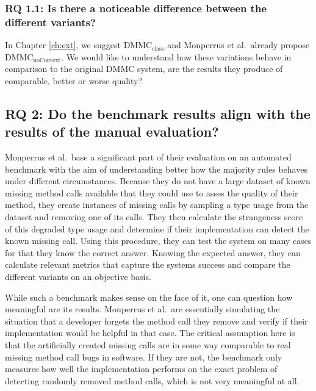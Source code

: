 \subsubsection{RQ 1.1: Is there a noticeable difference between the different variants?}

In Chapter \ref{ch:ext}, we suggest $\text{DMMC}_\text{class}$ and Monperrus et al.\ already propose $\text{DMMC}_\text{noContext}$.
We would like to understand how these variations behave in comparison to the original $\text{DMMC}$ system, are the results they produce of comparable, better or worse quality?

\subsection*{RQ 2: Do the benchmark results align with the results of the manual evaluation?}

Monperrus et al.\ base a significant part of their evaluation on an automated benchmark with the aim of understanding better how the majority rules behaves under different circumstances.
Because they do not have a large dataset of known missing method calls available that they could use to asses the quality of their method, they create instances of missing calls by sampling a type usage from the dataset and removing one of its calls.
They then calculate the strangeness score of this degraded type usage and determine if their implementation can detect the known missing call.
Using this procedure, they can test the system on many cases for that they know the correct answer.
Knowing the expected answer, they can calculate relevant metrics that capture the systems success and compare the different variants on an objective basis.

While such a benchmark makes sense on the face of it, one can question how meaningful are its results.
Monperrus et al.\ are essentially simulating the situation that a developer forgets the method call they remove and verify if their implementation would be helpful in that case.
The critical assumption here is that the artificially created missing calls are in some way comparable to real missing method call bugs in software.
If they are not, the benchmark only measures how well the implementation performs on the exact problem of detecting randomly removed method calls, which is not very meaningful at all.

